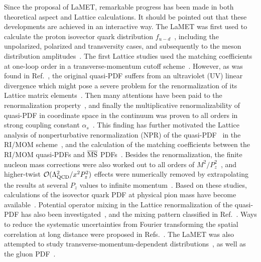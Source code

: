Since the proposal of LaMET, remarkable  progress has been made in both theoretical aspect  and    Lattice calculations. It should be pointed out that these developments are achieved  in an interactive way.   The LaMET was first used to calculate  the proton isovector quark distribution $f_{u-d}$~\cite{Lin:2014zya,Alexandrou:2015rja,Chen:2016utp,Alexandrou:2016jqi,Chen:2018fwa,Alexandrou:2018eet}, including the unpolarized, polarized and transversity cases, and subsequently  to the meson distribution amplitudes~\cite{Zhang:2017bzy,Chen:2017gck}. The first Lattice studies    used  the matching coefficients at   one-loop order in a transverse-momentum cutoff scheme~\cite{Xiong:2013bka,Ji:2015qla,Xiong:2015nua}. However, as was found in Ref.~\cite{Xiong:2013bka}, the original  quasi-PDF suffers from an ultraviolet (UV) linear divergence which might pose a severe problem for the renormalization of its Lattice matrix elements~\cite{Li:2016amo,Rossi:2017muf,Rossi:2018zkn}. Then many attentions have been paid to the renormalization property~\cite{Ji:2015jwa,Ishikawa:2016znu,Chen:2016fxx,Xiong:2017jtn,Constantinou:2017sej,Ji:2017oey,Ishikawa:2017faj,Green:2017xeu,Spanoudes:2018zya}, and finally  the  multiplicative renormalizability of quasi-PDF in coordinate space  in the continuum was proven to all orders in strong coupling constant $\alpha_s$~\cite{Ji:2017oey,Ishikawa:2017faj}. This finding has further  motivated the Lattice analysis of nonperturbative renormalization (NPR) of the quasi-PDF~\cite{Alexandrou:2017huk,Chen:2017mzz,Green:2017xeu} in the RI/MOM scheme~\cite{Martinelli:1994ty}, and the  calculation of the matching coefficients between the RI/MOM quasi-PDFs and $\overline{\rm MS}$ PDFs~\cite{Stewart:2017tvs}.
Besides the renormalization, the finite  nucleon mass corrections were also worked out to all orders of $M^2/P_z^2$~\cite{Chen:2016utp}, and  higher-twist $\mathcal O(\Lambda^2_{\rm QCD}/x^2P_z^2)$ effects were numerically removed by extrapolating the results at  {several $P_z$ values}  to infinite momentum~\cite{Lin:2014zya,Chen:2016utp}.
Based on these studies, calculations of the isovector quark PDF at physical pion mass have become available~\cite{Lin:2017ani,Alexandrou:2018pbm,Chen:2018xof,Alexandrou:2018eet}. Potential operator mixing in the Lattice renormalization of the quasi-PDF has also been investigated~\cite{Constantinou:2017sej,Alexandrou:2017huk,Green:2017xeu,Chen:2017mzz}, and  the mixing pattern classified in Ref.~\cite{Chen:2017mie}.
Ways to  {reduce} the systematic uncertainties from Fourier transforming the spatial correlation at long distance  {were}   proposed in Refs.~\cite{Lin:2017ani,Chen:2017lnm}.
The  LaMET was also attempted   to  study   transverse-momentum-dependent distributions~\cite{Ji:2014hxa,Ji:2018hvs,Ebert:2018gzl,Ebert:2019okf,Ebert:2019tvc,Ji:2019sxk,Shanahan:2019zcq,Ji:2019ewn}, as well as the gluon PDF~\cite{Wang:2017qyg,Wang:2017eel,Fan:2018dxu,Zhang:2018diq,Li:2018tpe,Wang:2019tgg}.



